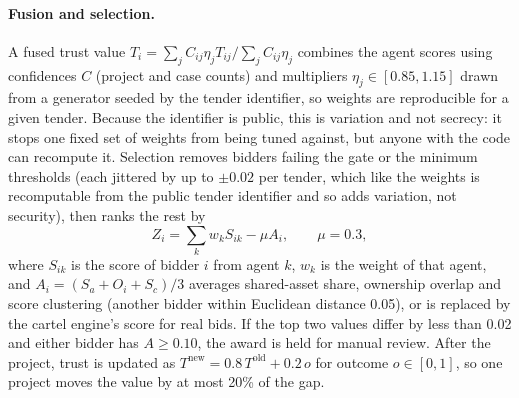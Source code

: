 \paragraph{Fusion and selection.} A fused trust value $T_i=\sum_jC_{ij}\eta_jT_{ij}/\sum_jC_{ij}\eta_j$ combines the agent scores using confidences $C$ (project and case counts) and multipliers $\eta_j\in[0.85,1.15]$ drawn from a generator seeded by the tender identifier, so weights are reproducible for a given tender. Because the identifier is public, this is variation and not secrecy: it stops one fixed set of weights from being tuned against, but anyone with the code can recompute it. Selection removes bidders failing the gate or the minimum thresholds (each jittered by up to $\pm0.02$ per tender, which like the weights is recomputable from the public tender identifier and so adds variation, not security), then ranks the rest by
\begin{equation}
Z_i=\sum_k w_kS_{ik}-\mu A_i,\qquad \mu=0.3,
\end{equation}
where $S_{ik}$ is the score of bidder $i$ from agent $k$, $w_k$ is the weight of that agent, and $A_i=(S_a+O_i+S_c)/3$ averages shared-asset share, ownership overlap and score clustering (another bidder within Euclidean distance 0.05), or is replaced by the cartel engine's score for real bids. If the top two values differ by less than 0.02 and either bidder has $A\ge0.10$, the award is held for manual review. After the project, trust is updated as $T^{\text{new}}=0.8\,T^{\text{old}}+0.2\,o$ for outcome $o\in[0,1]$, so one project moves the value by at most 20\% of the gap.
